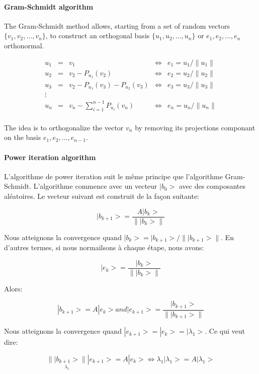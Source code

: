 \paragraph{Gram-Schmidt algorithm}{ The Gram-Schmidt method allows, starting from a set of random vectors $\{v_{1}, v_{2}, \dots, v_{n}\}$, to construct an orthogonal basis $\{u_{1}, u_{2}, \dots, u_{n}\}$ or $e_{1}, e_{2}, \dots, e_{n}$ orthonormal.

$$
\begin{array}{rclcl}
u_{1} & = & v_{1} & \Leftrightarrow& e_{1} = u_{1} / \| u_{1} \| \\
u_{2} & = & v_{2} - P_{u_{1}}(v_{2})& \Leftrightarrow& e_{2} = u_{2} / \| u_{2} \| \\
u_{3} & = & v_{2} - P_{u_{1}}(v_{3}) - P_{u_{2}}(v_{3})& \Leftrightarrow& e_{3} = u_{3} / \| u_{3} \| \\
\vdots &&&& \\
u_{n} & = & v_{n} - \sum_{i = 1}^{n-1} P_{u_{i}}(v_{n})& \Leftrightarrow& e_{n} = u_{n} / \| u_{n} \| \\
\end{array}
$$

The idea is to orthogonalize the vector $v_{n}$ by removing its projections componant on the basis $e_{1}, e_{2}, \dots, e_{n-1}$.
}

\paragraph{Power iteration algorithm}{

L'algorithme de power iteration suit le même principe que l'algorithme Gram-Schmidt. L'algorithme commence avec un vecteur $| b_{0} >$ avec des composantes aléatoires. Le vecteur suivant est construit de la façon suitante:

$$
| b_{k+1} > = \frac{A | b_{k} >}{\|| b_{k} >\|}
$$

Nous atteignons la convergence quand $| b_{k} > = | b_{k+1} > / \| | b_{k+1} > \|$. En d'autres termes, si nous normailsons à chaque étape, nous avons:

$$
| e_{k} > = \frac{| b_{k} > }{ \| | b_{k} > \|}
$$

Alors:

$$
| b_{k+1} > = A | e_{k} > and | e_{k+1} > = \frac{| b_{k+1} > }{ \| | b_{k+1} > \|}
$$

Nous atteignons la convergence quand $| e_{k+1} > = | e_{k} > = | \lambda_{1} >$.  Ce qui veut dire:

$$
\underset{\lambda_{1}}{\| | b_{k+1} > \|}| e_{k+1} > = A| e_{k} > \Leftrightarrow \lambda_{1} | \lambda_{1} > = A| \lambda_{1} >
$$
}


